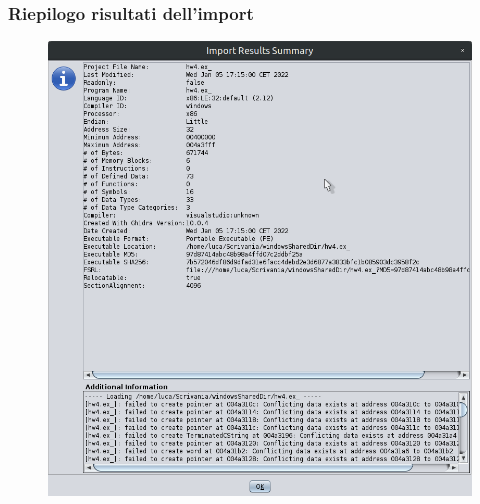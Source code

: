 \documentclass[a4paper, 12pt]{article}
\begin{document}
\subsubsection{Riepilogo risultati dell'import}
\begin{figure}[H]
\centering \includegraphics[width=\textwidth]{import}
\end{figure}
\end{document}

